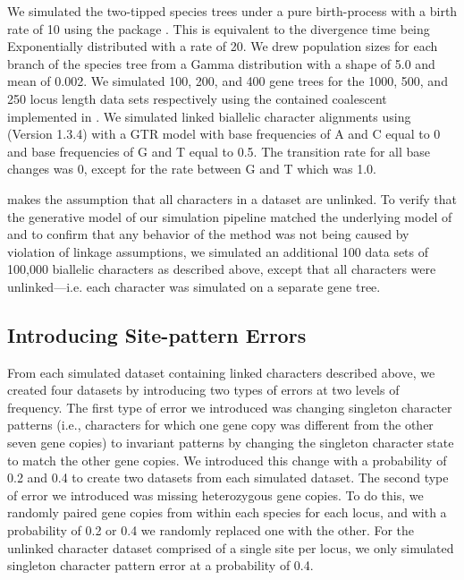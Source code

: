 We simulated the two-tipped species trees under a pure birth-process with a
birth rate of 10 using the \python package
\dendropy
\citep[Version 4.40;  branch commit eb69003;][]{Dendropy}.  
This is equivalent to the divergence time being Exponentially distributed with
a rate of 20.
We drew population sizes for each branch of the species tree from a Gamma 
distribution with a shape of 5.0 and mean of 0.002. We simulated 100, 200, and 
400 gene trees for the 1000, 500, and 250 locus length data sets respectively 
using the contained coalescent implemented in \dendropy.
We simulated linked biallelic character alignments using
\seqgen (Version 1.3.4)
\citep{rambautSeqGenApplicationMonte1997}
with a GTR model with base frequencies of A and C equal to 0 and base 
frequencies of G and T equal to 0.5. The transition rate for all base changes was 
0, except for the rate between G and T which was 1.0. 

\ecoevolity makes the assumption that all characters in a dataset are unlinked. 
To verify that the generative model of our simulation pipeline matched the underlying
model of \ecoevolity and to confirm that any behavior of the method was not 
being caused by violation of linkage assumptions, we simulated an additional 100 data sets of 
100,000 biallelic characters as described above, except that all characters 
were unlinked---i.e. each character was simulated on a separate gene tree. 

\subsection{Introducing Site-pattern Errors}
From each simulated dataset containing linked characters described above, we 
created four datasets by 
introducing two types of errors at two levels of frequency. The first type of 
error we introduced was changing singleton character patterns (i.e., characters 
for which one gene copy was different from the other seven gene copies) to invariant 
patterns by changing the singleton character state to match the other gene 
copies. We introduced this change with a probability of 0.2 and 0.4 to create 
two datasets from each simulated dataset. The second type of error we introduced 
was missing heterozygous gene copies. To do this, we randomly paired gene copies 
from within each species for each locus, and with a probability 
of 0.2 or 0.4 we randomly replaced one with the other. For the unlinked character 
dataset comprised of a single site per locus, we only simulated singleton 
character pattern error at a probability of 0.4.

